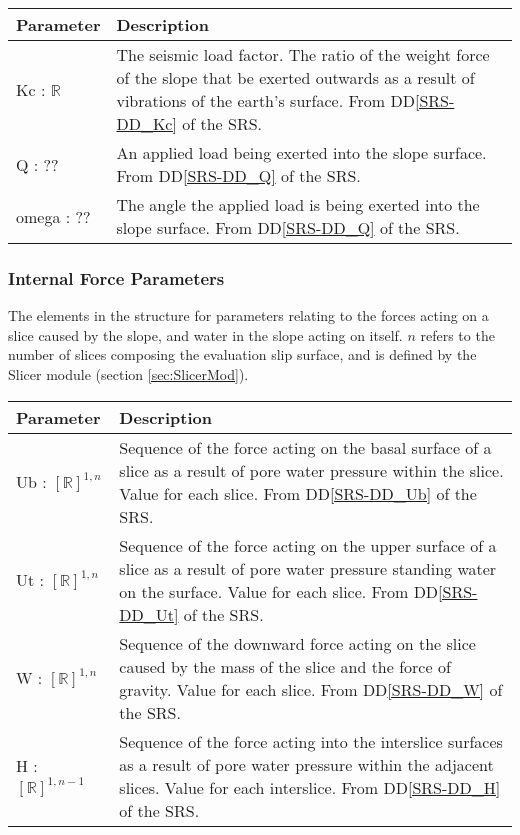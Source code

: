\documentclass[12pt, titlepage]{article}
\begin{document}
\begin{center}
\begin{longtable}{ p{}
    p{}}\hline 

  \textbf{Parameter} & \textbf{Description}\\ \hline

  Kc : $\mathbb{R}$ & The seismic load factor. The ratio of the weight
  force of the slope that be exerted outwards as a result of
  vibrations of the earth's surface. From DD\ref{SRS-DD_Kc} of the
  SRS.\\

  Q : ?? & An applied load being exerted into the slope surface. From
  DD\ref{SRS-DD_Q} of the SRS. \\

  omega : ?? & The angle the applied load is being exerted into the slope
  surface. From DD\ref{SRS-DD_Q} of the SRS.\\ \hline
\end{longtable}
\end{center}

\subsubsection{Internal Force Parameters} \label{Tbl:ForceParam}
\noindent
The elements in the structure for parameters relating to the forces
acting on a slice caused by the slope, and water in the slope acting
on itself. $n$ refers to the number of slices composing the evaluation
slip surface, and is defined by the Slicer module (section
\ref{sec:SlicerMod}).

\begin{center}
\begin{longtable}{ p{} 
    p{}}\hline 

  \textbf{Parameter} & \textbf{Description}\\ \hline

  Ub : $[\mathbb{R}]^{1,n}$ & Sequence of the force acting on the
  basal surface of a slice as a result of pore water pressure within
  the slice. Value for each slice. From DD\ref{SRS-DD_Ub} of the
  SRS.\\
  
  Ut : $[\mathbb{R}]^{1,n}$ & Sequence of the force acting on the
  upper surface of a slice as a result of pore water pressure standing
  water on the surface. Value for each slice. From DD\ref{SRS-DD_Ut}
  of the SRS.\\

  W : $[\mathbb{R}]^{1,n}$ & Sequence of the downward force acting on
  the slice caused by the mass of the slice and the force of
  gravity. Value for each slice. From DD\ref{SRS-DD_W} of the SRS.\\

  H : $[\mathbb{R}]^{1,n-1}$ & Sequence of the force acting into the
  interslice surfaces as a result of pore water pressure within the
  adjacent slices. Value for each interslice. From DD\ref{SRS-DD_H} of
  the SRS.\\
\end{longtable}
\end{center}
\end{document}
